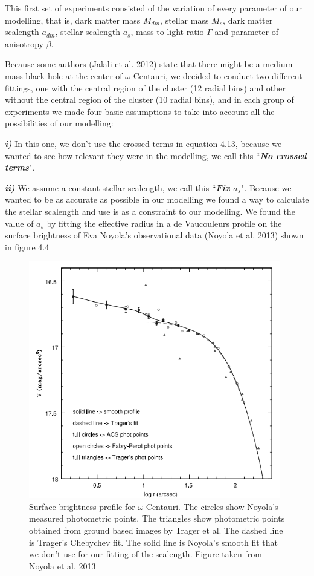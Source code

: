 This first set of experiments consisted of the variation of every parameter of our modelling, that is, dark matter mass $M_{dm}$, stellar mass $M_{s}$, dark matter scalength $a_{dm}$, stellar scalength $a_{s}$, mass-to-light ratio $\Gamma$ and parameter of anisotropy $\beta$.

Because some authors (Jalali et al. 2012) state that there might be a medium-mass black hole at the center of $\omega$ Centauri, we decided to conduct two different fittings, one with the central region of the cluster (12 radial bins) and other without the central region of the cluster (10 radial bins), and in each group of experiments we made four basic assumptions to take into account all the possibilities of our modelling:

\textbf{\textit{i)}} In this one, we don't use the crossed terms in equation 4.13, because we wanted to see how relevant they were in the modelling, we call this ``\textbf{\textit{No crossed terms}}". 

\textbf{\textit{ii)}} We assume a constant stellar scalength, we call this ``\textbf{\textit{Fix $a_{s}$}}". Because we wanted to be as accurate as possible in our modelling we found a way to calculate the stellar scalength and use is as a constraint to our modelling. We found the value of $a_{s}$ by fitting the effective radius in a de Vaucouleurs profile on the surface brightness of Eva Noyola's observational data (Noyola et al. 2013) shown in figure 4.4

\begin{figure}[H]
\centering
\includegraphics[width=11cm]{images/noyola.png}
\caption[Surface brightness profile of Omega Centauri]{Surface brightness profile for $\omega$ Centauri. The circles show
Noyola's measured photometric points. The triangles show photometric points obtained from ground based images by Trager et al. The dashed line is Trager’s Chebychev fit. The solid line is Noyola's smooth fit that we don't use for our fitting of the scalength. Figure taken from Noyola et al. 2013}
\end{figure}

